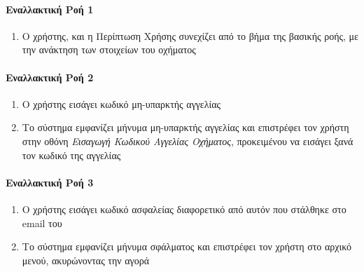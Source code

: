 \documentclass{../ol-softwaremanual}
\begin{document}
\begin{enumerate}
	\end{enumerate}
	
	\paragraph{Εναλλακτική Ροή 1}
	\begin{enumerate}
		\item Ο χρήστης,  και η Περίπτωση Χρήσης συνεχίζει από το βήμα  της βασικής ροής, με την ανάκτηση των στοιχείων του οχήματος
	\end{enumerate}
	
	\paragraph{Εναλλακτική Ροή 2}
	\begin{enumerate}
		\item Ο χρήστης εισάγει κωδικό μη-υπαρκτής αγγελίας
		\item Το σύστημα εμφανίζει μήνυμα μη-υπαρκτής αγγελίας και επιστρέφει τον χρήστη στην οθόνη \textit{Εισαγωγή Κωδικού Αγγελίας Οχήματος}, προκειμένου να εισάγει ξανά τον κωδικό της αγγελίας 
	\end{enumerate}
	
	\paragraph{Εναλλακτική Ροή 3}
	\begin{enumerate}
			\item Ο χρήστης εισάγει κωδικό ασφαλείας διαφορετικό από αυτόν που στάλθηκε στο \en email \gr του
			\item Το σύστημα εμφανίζει μήνυμα σφάλματος και επιστρέφει τον χρήστη στο αρχικό μενού, ακυρώνοντας την αγορά
	\end{enumerate}
	
\end{document}
